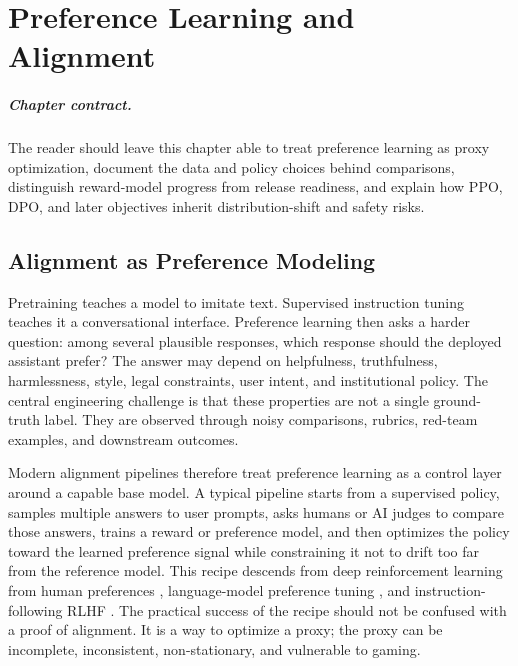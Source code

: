 \chapter{Preference Learning and Alignment}
\label{ch:preference-learning-alignment}


\paragraph{Chapter contract.} The reader should leave this chapter able to treat preference learning as proxy optimization, document the data and policy choices behind comparisons, distinguish reward-model progress from release readiness, and explain how PPO, DPO, and later objectives inherit distribution-shift and safety risks.

\section{Alignment as Preference Modeling}
Pretraining teaches a model to imitate text. Supervised instruction tuning teaches it a conversational interface. Preference learning then asks a harder question: among several plausible responses, which response should the deployed assistant prefer? The answer may depend on helpfulness, truthfulness, harmlessness, style, legal constraints, user intent, and institutional policy. The central engineering challenge is that these properties are not a single ground-truth label. They are observed through noisy comparisons, rubrics, red-team examples, and downstream outcomes.

Modern alignment pipelines therefore treat preference learning as a control layer around a capable base model. A typical pipeline starts from a supervised policy, samples multiple answers to user prompts, asks humans or AI judges to compare those answers, trains a reward or preference model, and then optimizes the policy toward the learned preference signal while constraining it not to drift too far from the reference model. This recipe descends from deep reinforcement learning from human preferences \cite{christiano2017deep}, language-model preference tuning \cite{ziegler2019finetuning,stiennon2020learning}, and instruction-following RLHF \cite{ouyang2022training}. The practical success of the recipe should not be confused with a proof of alignment. It is a way to optimize a proxy; the proxy can be incomplete, inconsistent, non-stationary, and vulnerable to gaming.

